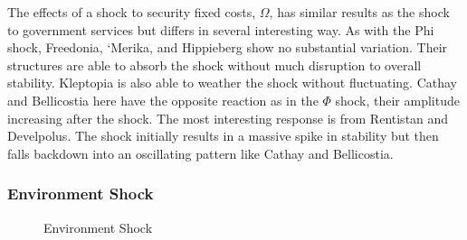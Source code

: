 \documentclass[12pt]{article}
\begin{document}
\begin{spacing}{1.5}
The effects of a shock to security fixed costs, $\Omega$, has similar results as the shock to government services but differs in several interesting way. As with the Phi shock, Freedonia, `Merika, and Hippieberg show no substantial variation. Their structures are able to absorb the shock without much disruption to overall stability. Kleptopia is also able to weather the shock without fluctuating. Cathay and Bellicostia here have the opposite reaction as in the $\Phi$ shock, their amplitude increasing after the shock. The most interesting response is from Rentistan and Develpolus. The shock initially results in a massive spike in stability but then falls backdown into an oscillating pattern like Cathay and Bellicostia. %


\subsubsection{Environment Shock}

\begin{figure}
\centering
\caption{Environment Shock}
\end{figure}



\end{spacing}
\end{document}
